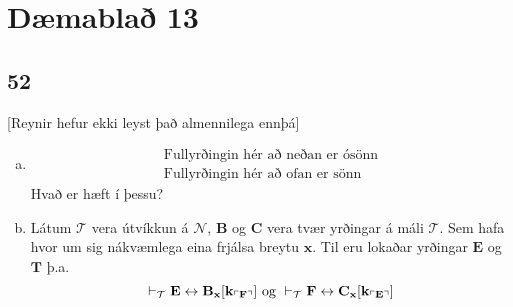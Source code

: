 \documentclass[12pt]{book}
\newcommand{\cT}{\mathcal{T}}
\newcommand{\cN}{\mathcal{N}}
\newcommand{\bB}{\mathbf{B}}
\newcommand{\bC}{\mathbf{C}}
\newcommand{\vT}{\vdash_{\cT}}
\newcommand{\bE}{\mathbf{E}}
\newcommand{\bF}{\mathbf{F}}
\newcommand{\bT}{\mathbf{T}}
\newcommand{\bx}{\mathbf{x}}
\newcommand{\bk}{\mathbf{k}}
\DeclarePairedDelimiter{\god}{\ulcorner}{\urcorner}
\begin{document}
\chapter{Dæmablað 13}

\section{52}

[Reynir hefur ekki leyst það almennilega ennþá]

\begin{daemi}
  \begin{enumerate}[(a)]
  \item 
    \begin{gather*}
      \text{Fullyrðingin hér að neðan er ósönn}\\
      \text{Fullyrðingin hér að ofan er sönn}
    \end{gather*}
    Hvað er hæft í þessu?
  \item Látum $\cT$ vera útvíkkun á $\cN$, $\bB$ og $\bC$ vera tvær yrðingar á
    máli $\cT$. Sem hafa hvor um sig nákvæmlega  eina frjálsa breytu $\bx$.
    Til eru lokaðar yrðingar $\bE$ og $\bT$ þ.a.
    \[ \vT \bE \leftrightarrow \bB_{\bx}[\bk_{\god{\bF}}] \text{ og } \vT \bF \leftrightarrow \bC_{\bx}[\bk_{\god{\bE}}]\]
  \end{enumerate}
\end{daemi}
\end{document}
